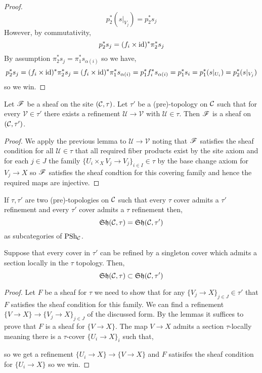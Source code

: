 \documentclass[12pt]{article}
\begin{document}
\begin{proof}
\[ p_2^* (s|_{V_j}) = p_2^* s_j \]
However, by commutativity,
\[ p_2^* s_j = (f_i \times \mathrm{id})^* \pi_2^* s_j \]
By assumption $\pi_2^* s_j = \pi_1^* s_{\alpha(i)}$ so we have, 
\[ p_2^* s_j = (f_i \times \mathrm{id})^* \pi_2^* s_j = (f_i \times \mathrm{id})^* \pi_1^* s_{\alpha(i)} = p_1^* f_i^* s_{\alpha(i)} = p_1^* s_i = p_1^* (s|_{U_i}) = p_2^* (s|_{V_j}) \]
so we win.
\end{proof}

\begin{prop}
Let $\mathscr{F}$ be a sheaf on the site $(\mathcal{C}, \tau)$. Let $\tau'$ be a (pre)-topology on $\mathcal{C}$ such that for every $\mathcal{V} \in \tau'$ there exists a refinement $\mathcal{U} \to \mathcal{V}$ with $\mathcal{U} \in \tau$. Then $\mathscr{F}$ is a sheaf on $(\mathcal{C}, \tau')$.
\end{prop}

\begin{proof}
We apply the previous lemma to $\mathcal{U} \to \mathcal{V}$ noting that $\mathscr{F}$ satisfies the sheaf condition for all $\mathcal{U} \in \tau$ that all required fiber products exist by the site axiom and for each $j \in J$ the family $\{ U_i \times_X V_j \to V_j \}_{i \in I} \in \tau$ by the base change axiom for $V_j \to X$ so $\mathscr{F}$ satisfies the sheaf condtion for this covering family and hence the required maps are injective.
\end{proof}

\begin{cor}
If $\tau, \tau'$ are two (pre)-topologies on $\mathcal{C}$ such that every $\tau$ cover admits a $\tau'$ refinement and every $\tau'$ cover admits a $\tau$ refinement then,
\[ \mathfrak{Sh}(\mathcal{C}, \tau) = \mathfrak{Sh}(\mathcal{C}, \tau') \]
as subcategories of $\mathrm{PSh}_{\mathcal{C}}$. 
\end{cor}

\begin{cor}
Suppose that every cover in $\tau'$ can be refined by a singleton cover which admits a section locally in the $\tau$ topology. Then,
\[ \mathfrak{Sh}(\mathcal{C}, \tau) \subset \mathfrak{Sh}(\mathcal{C}, \tau') \]
\end{cor}

\begin{proof}
Let $F$ be a sheaf for $\tau$ we need to show that for any $\{ V_j \to X \}_{j \in J} \in \tau'$ that $F$ satisfies the sheaf condition for this family. We can find a refinement $\{ V \to X \} \to \{ V_j \to X \}_{j \in J}$ of the discussed form. By the lemmas it suffices to prove that $F$ is a sheaf for $\{ V \to X \}$. The map $V \to X$ admits a section $\tau$-locally meaning there is a $\tau$-cover $\{ U_{i} \to X \}_i$ such that,
\begin{center}
\end{center}
so we get a refinement $\{ U_{i} \to X \} \to \{ V \to X \}$ and $F$ satisifes the sheaf condition for $\{ U_{i} \to X \}$ so we win. 
\end{proof}
\end{document}
